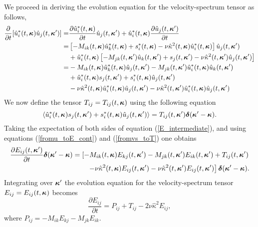 \documentclass[oneside,a4paper,11pt]{report}
\begin{document}
We proceed in deriving the evolution equation for the velocity-spectrum tensor as follows,
\begin{align}
\label{E_intermediate}
\frac{\partial}{ \partial t} [ \hat{u}_i^*(t,\boldsymbol\kappa) \hat{u}_j(t,\boldsymbol\kappa') ] =& \frac{\partial \hat{u}_i^*(t,\boldsymbol\kappa)}{\partial t} \hat{u}_j(t,\boldsymbol\kappa') + \hat{u}_i^*(t,\boldsymbol\kappa) \frac{\partial \hat{u}_j(t,\boldsymbol\kappa')}{\partial t} \nonumber \\
=& \left [ -M_{ik}(t,\boldsymbol\kappa) \hat{u}_k^*(t,\boldsymbol\kappa) + s_i^*(t,\boldsymbol\kappa) - \nu \hat{\kappa}^2(t,\boldsymbol\kappa) \hat{u}_i^*(t,\boldsymbol\kappa) \right ] \hat{u}_j(t,\boldsymbol\kappa') \nonumber \\
&+ \hat{u}_i^*(t,\boldsymbol\kappa)  \left [ -M_{jk}(t,\boldsymbol\kappa') \hat{u}_k(t,\boldsymbol\kappa') + s_j(t,\boldsymbol\kappa') - \nu \hat{\kappa}^2(t,\boldsymbol\kappa') \hat{u}_j(t,\boldsymbol\kappa') \right ] \nonumber \\
=& -M_{ik}(t,\boldsymbol\kappa) \hat{u}_k^*(t,\boldsymbol\kappa) \hat{u}_j(t,\boldsymbol\kappa') - M_{jk}(t,\boldsymbol\kappa') \hat{u}_i^*(t,\boldsymbol\kappa) \hat{u}_k(t,\boldsymbol\kappa') \nonumber \\
& + \hat{u}_i^*(t,\boldsymbol\kappa) s_j(t,\boldsymbol\kappa') + s^*_i(t,\boldsymbol\kappa) \hat{u}_j(t,\boldsymbol\kappa') \nonumber \\
& - \nu \hat{\kappa}^2(t,\boldsymbol\kappa) \hat{u}^*_i(t,\boldsymbol\kappa) \hat{u}_j(t,\boldsymbol\kappa') - \nu \hat{\kappa}^2(t,\boldsymbol\kappa') \hat{u}^*_i(t,\boldsymbol\kappa) \hat{u}_j(t,\boldsymbol\kappa')
\end{align}
We now define the tensor $T_{ij} = T_{ij}(t,\boldsymbol\kappa)$ using the following equation
\begin{equation}
\label{fromvs_toT}
\langle \hat{u}_i^*(t,\boldsymbol\kappa) s_j(t,\boldsymbol\kappa') + s^*_i(t,\boldsymbol\kappa) \hat{u}_j(t,\boldsymbol\kappa') \rangle = T_{ij}(t,\boldsymbol\kappa') \boldsymbol{\delta}(\boldsymbol\kappa' - \boldsymbol\kappa).
\end{equation}
Taking the expectation of both sides of equation (\ref{E_intermediate}), and using equations (\ref{fromu_toE_cont}) and (\ref{fromvs_toT}) one obtains
\begin{equation}
\begin{split}
\frac{\partial E_{ij}(t,\boldsymbol\kappa')}{\partial t} \boldsymbol{\delta}(\boldsymbol\kappa' - \boldsymbol\kappa) = \left [ -M_{ik}(t,\boldsymbol\kappa) E_{kj}(t,\boldsymbol\kappa') - M_{jk}(t,\boldsymbol\kappa') E_{ik}(t,\boldsymbol\kappa') + T_{ij}(t,\boldsymbol\kappa') \right . \\
\left . - \nu \hat{\kappa}^2(t,\boldsymbol\kappa) E_{ij}(t,\boldsymbol\kappa') - \nu \hat{\kappa}^2(t,\boldsymbol\kappa') E_{ij}(t,\boldsymbol\kappa') \right ] \boldsymbol{\delta}(\boldsymbol\kappa' - \boldsymbol\kappa).
\end{split}
\end{equation}
Integrating over $\boldsymbol\kappa'$ the evolution equation for the velocity-spectrum tensor $E_{ij} = E_{ij}(t,\boldsymbol\kappa)$ becomes
\begin{equation}
\label{E_evol_homo}
\frac{\partial E_{ij}}{\partial t} = P_{ij} + T_{ij} - 2\nu \hat{\kappa}^2 E_{ij},
\end{equation}
where $P_{ij} = -M_{ik} E_{kj} - M_{jk} E_{ik}$.
\end{document}
